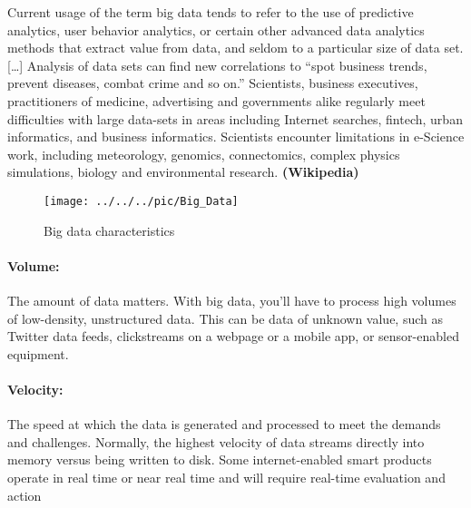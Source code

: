 Current usage of the term big data tends to refer to the use of predictive analytics, user behavior analytics, or certain other advanced data analytics methods that extract value from data, and seldom to a particular size of data set. [\dots]
Analysis of data sets can find new correlations to ``spot business trends, prevent diseases, combat crime and so on.'' Scientists, business executives, practitioners of medicine, advertising and governments alike regularly meet difficulties with large data-sets in areas including Internet searches, fintech, urban informatics, and business informatics. Scientists encounter limitations in e-Science work, including meteorology, genomics, connectomics, complex physics simulations, biology and environmental research. \textbf{(Wikipedia)}


\pbn
\begin{figure}[H]
	\begin{center}
		\texttt{[image: ../../../pic/Big\_Data]}
	\end{center}
	\caption{Big data characteristics}
\end{figure}




\pbn
\paragraph{Volume:} The amount of data matters. With big data, you’ll have to process high volumes of low-density, unstructured data. This can be data of unknown value, such as Twitter data feeds, clickstreams on a webpage or a mobile app, or sensor-enabled equipment.
\paragraph{Velocity:} The speed at which the data is generated and processed to meet the demands and challenges.  Normally, the highest velocity of data streams directly into memory versus being written to disk. Some internet-enabled smart products operate in real time or near real time and will require real-time evaluation and action

